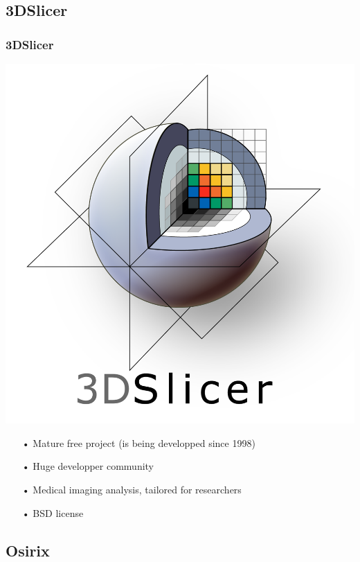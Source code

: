\documentclass[11pt]{beamer}
\begin{document}
\subsection{3DSlicer}

\begin{frame}
\frametitle{3DSlicer}
\includegraphics[scale=0.06]{Slicer.png}
\begin{itemize}[<+->]
\item[•] Mature free project (is being developped since 1998)
\item[•] Huge developper community
\item[•] Medical imaging analysis, tailored for researchers
\item[•] BSD license
\end{itemize}
\end{frame}

\subsection{Osirix}
\end{document}
